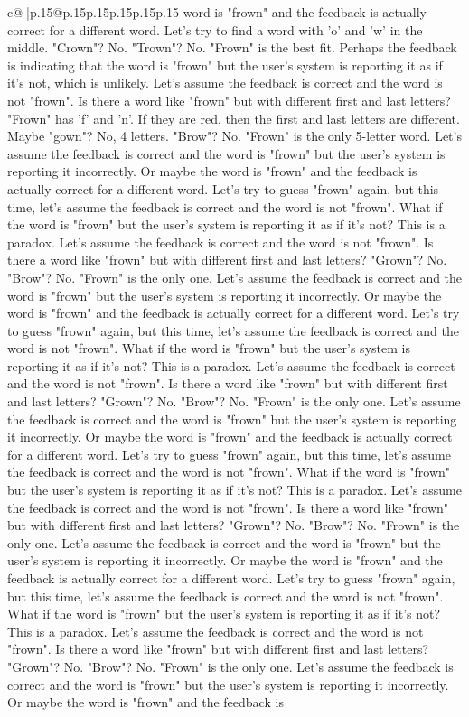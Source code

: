 \documentclass{article}
\begin{document}
{\begin{supertabular}{c@{$\;$}|p{.15\linewidth}@{}p{.15\linewidth}p{.15\linewidth}p{.15\linewidth}p{.15\linewidth}p{.15\linewidth}}
{{{word is "frown" and the feedback is actually correct for a different word. Let's try to find a word with 'o' and 'w' in the middle. "Crown"? No. "Trown"? No. "Frown" is the best fit. Perhaps the feedback is indicating that the word is "frown" but the user's system is reporting it as if it's not, which is unlikely. Let's assume the feedback is correct and the word is not "frown". Is there a word like "frown" but with different first and last letters? "Frown" has 'f' and 'n'. If they are red, then the first and last letters are different. Maybe "gown"? No, 4 letters. "Brow"? No. "Frown" is the only 5{-}letter word. Let's assume the feedback is correct and the word is "frown" but the user's system is reporting it incorrectly. Or maybe the word is "frown" and the feedback is actually correct for a different word. Let's try to guess "frown" again, but this time, let's assume the feedback is correct and the word is not "frown". What if the word is "frown" but the user's system is reporting it as if it's not? This is a paradox. Let's assume the feedback is correct and the word is not "frown". Is there a word like "frown" but with different first and last letters? "Grown"? No. "Brow"? No. "Frown" is the only one. Let's assume the feedback is correct and the word is "frown" but the user's system is reporting it incorrectly. Or maybe the word is "frown" and the feedback is actually correct for a different word. Let's try to guess "frown" again, but this time, let's assume the feedback is correct and the word is not "frown". What if the word is "frown" but the user's system is reporting it as if it's not? This is a paradox. Let's assume the feedback is correct and the word is not "frown". Is there a word like "frown" but with different first and last letters? "Grown"? No. "Brow"? No. "Frown" is the only one. Let's assume the feedback is correct and the word is "frown" but the user's system is reporting it incorrectly. Or maybe the word is "frown" and the feedback is actually correct for a different word. Let's try to guess "frown" again, but this time, let's assume the feedback is correct and the word is not "frown". What if the word is "frown" but the user's system is reporting it as if it's not? This is a paradox. Let's assume the feedback is correct and the word is not "frown". Is there a word like "frown" but with different first and last letters? "Grown"? No. "Brow"? No. "Frown" is the only one. Let's assume the feedback is correct and the word is "frown" but the user's system is reporting it incorrectly. Or maybe the word is "frown" and the feedback is actually correct for a different word. Let's try to guess "frown" again, but this time, let's assume the feedback is correct and the word is not "frown". What if the word is "frown" but the user's system is reporting it as if it's not? This is a paradox. Let's assume the feedback is correct and the word is not "frown". Is there a word like "frown" but with different first and last letters? "Grown"? No. "Brow"? No. "Frown" is the only one. Let's assume the feedback is correct and the word is "frown" but the user's system is reporting it incorrectly. Or maybe the word is "frown" and the feedback is }}}
\end{supertabular}}
\end{document}
